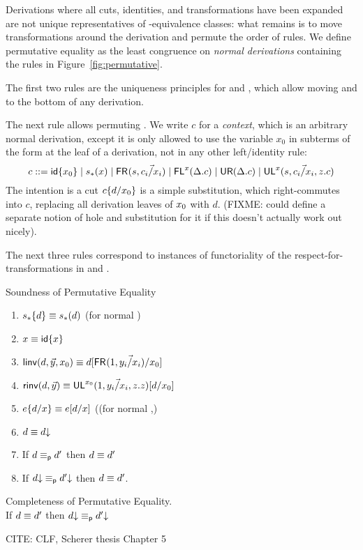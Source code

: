 Derivations where all cuts, identities, and transformations have been
expanded are not unique representatives of \deq-equivalence classes:
what remains is to move transformations around the derivation and
permute the order of rules.  We define permutative equality as the least
congruence on \emph{normal derivations} containing the rules in
Figure~\ref{fig:permutative}.

The first two rules are the uniqueness principles for \Fsymb\/ and
\Usymb\/, which allow moving \FL\/ and \UR\/ to the bottom of any
derivation.  

The next rule allows permuting \UL.  We write $c$ for a \emph{context},
which is an arbitrary normal derivation, except it is only allowed to
use the variable $x_0$ in subterms of the form  at the leaf
of a derivation, not in any other left/identity rule:
\[
c ::= {\mathsf{id}\{x_0\}} \mid s_*(x) \mid \mathsf{FR}_{}(s,\vec{c_i/x_i}) \mid \mathsf{FL}^{x}(\Delta.c) \mid \mathsf{UR}(\Delta.c) \mid \mathsf{UL}^{x}_{}(s,\vec{c_i/x_i},z.c)
\]
The intention is a cut $c\{d/x_0\}$ is a simple substitution,
which right-commutes into $c$, replacing all derivation leaves of
${x_0}$ with $d$.  (FIXME: could define a separate notion of hole
and substitution for it if this doesn't actually work out nicely).  

The next three rules correspond to instances of
functoriality of the respect-for-transformations in \UL\/ and \FR\/.

\begin{conjecture}{Soundness of Permutative Equality} \label{thm:permutative-soundess}
\begin{enumerate}
\item $s_*\{d\} \equiv s_*(d)$ (for normal \D)
\item $x \equiv {\ensuremath{\mathsf{id}}\{x\}}$
\item $\mathsf{linv}(d,\vec{y},x_0) \equiv d[\mathsf{FR}_{}(1,\vec{y_i/x_i})/x_0]$
\item $\mathsf{rinv}(d,\vec{y}) \equiv \mathsf{UL}^{x_0}_{}(1,\vec{y_i/x_i},z.z)[d/x_0]$
\item $e\{d/x\} \equiv e[d/x]$ ((for normal \D,\E)
\item $d \equiv d\mathord{\downarrow}$
\item If $d \equiv_{\mathsf{p}} d'$ then $d \equiv d'$
\item If $d\mathord{\downarrow} \equiv_{\mathsf{p}} d'\mathord{\downarrow}$ then $d \equiv d'$.  
\end{enumerate}
\end{conjecture}

\begin{conjecture}{Completeness of Permutative Equality.}\\ \label{thm:permutative-completeness}
If $d \equiv d'$ then $d\mathord{\downarrow} \equiv_{\mathsf{p}} d'\mathord{\downarrow}$
\end{conjecture}

CITE: CLF, Scherer thesis Chapter 5
